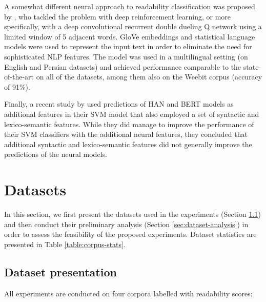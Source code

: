\documentclass{clv3}
\begin{document}
A somewhat different neural approach to readability classification was proposed by \citet{mohammadi2019text}, who tackled the problem with deep reinforcement learning, or more specifically, with a deep convolutional recurrent double dueling Q network \citep{wang2016dueling} using a limited window of 5 adjacent words. GloVe embeddings and statistical language models were used to represent the input text in order to eliminate the need for sophisticated NLP features. The model was used in a multilingual setting (on English and Persian datasets) and achieved performance comparable to the state-of-the-art on all of the datasets, among them also on the Weebit corpus (accuracy of 91\%). 

Finally, a recent study by \citet{deutsch2020linguistic} used predictions of HAN and BERT models as additional features in their SVM model that also employed a set of syntactic and lexico-semantic features. While they did manage to improve the performance of their SVM classifiers with the additional neural features, they concluded that additional syntactic and lexico-semantic features did not generally improve the predictions of the neural models.


\section{Datasets}
\label{sec:datasets}

In this section, we first present the datasets used in the experiments (Section \ref{sec:dataset-presentation}) and then conduct their preliminary analysis (Section \ref{sec:dataset-analysis}) in order to assess the feasibility of the proposed experiments. Dataset statistics are presented in Table \ref{table:corpus-stats}.

\subsection{Dataset presentation}
\label{sec:dataset-presentation}
All experiments are conducted on four corpora labelled with readability scores:
\end{document}
